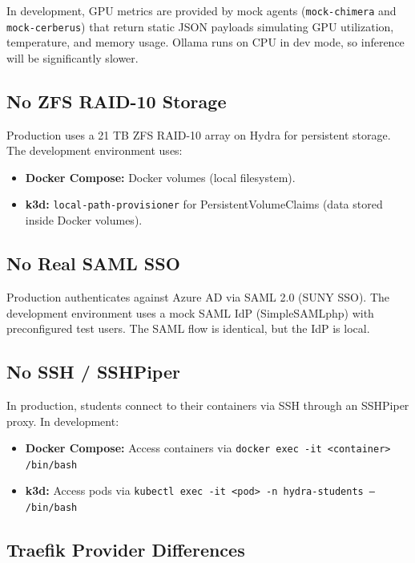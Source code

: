 \documentclass[11pt,a4paper]{article}
\newcommand{\cmdref}[1]{\texttt{#1}}
\begin{document}
In development, GPU metrics are provided by mock agents
(\texttt{mock-chimera} and \texttt{mock-cerberus}) that return static
JSON payloads simulating GPU utilization, temperature, and memory usage.
Ollama runs on CPU in dev mode, so inference will be significantly slower.

\subsection{No ZFS RAID-10 Storage}

Production uses a 21 TB ZFS RAID-10 array on Hydra for persistent storage.
The development environment uses:

\begin{itemize}[leftmargin=2em]
    \item \textbf{Docker Compose:} Docker volumes (local filesystem).
    \item \textbf{k3d:} \texttt{local-path-provisioner} for
          PersistentVolumeClaims (data stored inside Docker volumes).
\end{itemize}

\subsection{No Real SAML SSO}

Production authenticates against Azure AD via SAML 2.0 (SUNY SSO). The
development environment uses a mock SAML IdP (SimpleSAMLphp) with
preconfigured test users. The SAML flow is identical, but the IdP is local.

\subsection{No SSH / SSHPiper}

In production, students connect to their containers via SSH through an
SSHPiper proxy. In development:

\begin{itemize}[leftmargin=2em]
    \item \textbf{Docker Compose:} Access containers via
          \cmdref{docker exec -it <container> /bin/bash}
    \item \textbf{k3d:} Access pods via
          \cmdref{kubectl exec -it <pod> -n hydra-students -- /bin/bash}
\end{itemize}

\subsection{Traefik Provider Differences}
\end{document}
